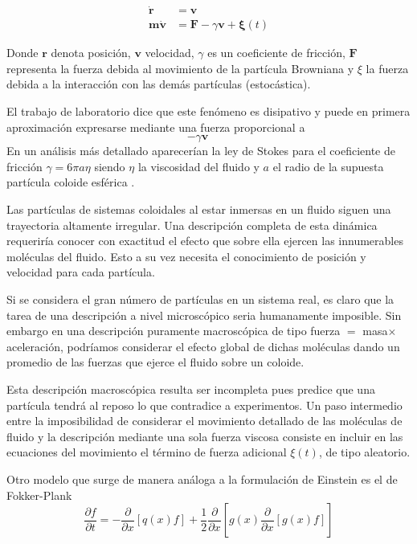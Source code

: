   \begin{align}\label{eqn:Langevin}
  	\mathbf{\dot{r}}&=\mathbf{v} \\
	\mathbf{m\dot{v}}&=\mathbf{F}-\gamma \mathbf{v} + \mathbf{\xi}(t)
  \end{align}
  
  Donde $\mathbf{r}$ denota posici\'on, $\mathbf{v}$ velocidad, $\gamma$ es un coeficiente de fricci\'on,
  $\mathbf{F}$ representa la fuerza debida al movimiento de la part\'icula Browniana y $\xi$ la fuerza 
  debida a la interacci\'on con las dem\'as part\'iculas (estoc\'astica).
  
  El trabajo de laboratorio dice que este fen\'omeno es disipativo y puede en primera 
  aproximaci\'on expresarse mediante una fuerza proporcional a  
  $$
  -\gamma \mathbf{v}  \qquad 
  $$
  En un an\'alisis m\'as detallado aparecer\'ian la ley de Stokes para el coeficiente de 
  fricci\'on  $\gamma = 6\pi a\eta$ siendo $\eta$ la viscosidad del fluido y $a$ el radio 
  de la supuesta part\'icula coloide esf\'erica \cite{toral2002Ruimasruiporfav}.
  
  Las part\'iculas de sistemas coloidales al estar inmersas en un fluido siguen 
  una trayectoria altamente irregular. Una descripci\'on completa de esta din\'amica 
  requerir\'ia conocer con exactitud el efecto que sobre ella ejercen las innumerables
  mol\'eculas del fluido. Esto a su vez necesita el conocimiento de posici\'on y 
  velocidad para cada part\'icula.
  
  Si se considera el gran n\'umero de part\'iculas en un sistema real, es claro 
  que la tarea de una descripci\'on a nivel microsc\'opico seria humanamente imposible.
  Sin embargo en una descripción puramente macrosc\'opica de tipo fuerza $=$ masa$\times$
  aceleraci\'on, podr\'iamos considerar el efecto global de dichas mol\'eculas dando 
  un promedio de las fuerzas que ejerce el fluido sobre un coloide. 
  
  Esta descripci\'on macrosc\'opica resulta ser incompleta pues predice que una
  partícula tendrá al reposo lo que contradice a experimentos. Un paso intermedio
  entre la imposibilidad de considerar el movimiento detallado de las mol\'eculas de 
  fluido y la descripci\'on mediante una sola fuerza viscosa consiste en incluir en 
  las ecuaciones del movimiento el t\'ermino de fuerza adicional $\xi(t)$, de tipo aleatorio. 
 
  Otro modelo que surge de manera an\'aloga a la formulaci\'on de Einstein es el de Fokker-Plank
  \begin{equation}\label{eqn:Fokker-Planck}
	\frac{\partial f }{\partial t}=-\frac{\partial}{\partial x} 
	\left[
	  q(x)f
	\right]
	+\frac{1}{2}\frac{\partial}{\partial x}
	\left[
	  g(x) \frac{\partial}{\partial x}
	  \left[
		g(x)f
	  \right]
	\right]
  \end{equation}
  
